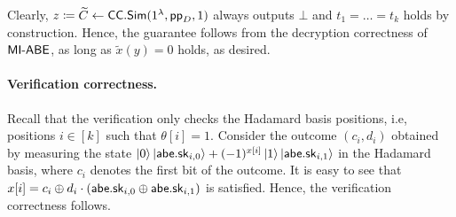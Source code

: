 Clearly, $z \coloneqq \widetilde{C} \leftarrow \mathsf{CC}.\mathsf{Sim}(1^\lambda, \mathsf{pp}_D, 1)$ always outputs $\bot$
and $t_1 = \ldots = t_k$ holds by construction. Hence, the guarantee
follows from the decryption correctness of $\mathsf{MI}\textrm{-}\mathsf{ABE}$, as long as
$\widetilde{x}(y) = 0$ holds, as desired.

\paragraph{Verification correctness.}

Recall that the verification only checks the Hadamard basis positions,
i.e, positions $i \in [k]$ such that $\theta[i] = 1$. Consider the
outcome $(c_i, d_i)$ obtained by measuring the state
$\ket{0}\ket{\mathsf{abe}.\mathsf{sk}_{i,0}}+(-1)^{x[i]}\ket{1}\ket{\mathsf{abe}.\mathsf{sk}_{i,1}}$
in the Hadamard basis, where $c_i$ denotes the first bit of the
outcome. It is easy to see that $x[i] = c_i \oplus d_i \cdot
(\mathsf{abe}.\mathsf{sk}_{i, 0} \oplus \mathsf{abe}.\mathsf{sk}_{i, 1})$ is satisfied. Hence, the
verification correctness follows.

